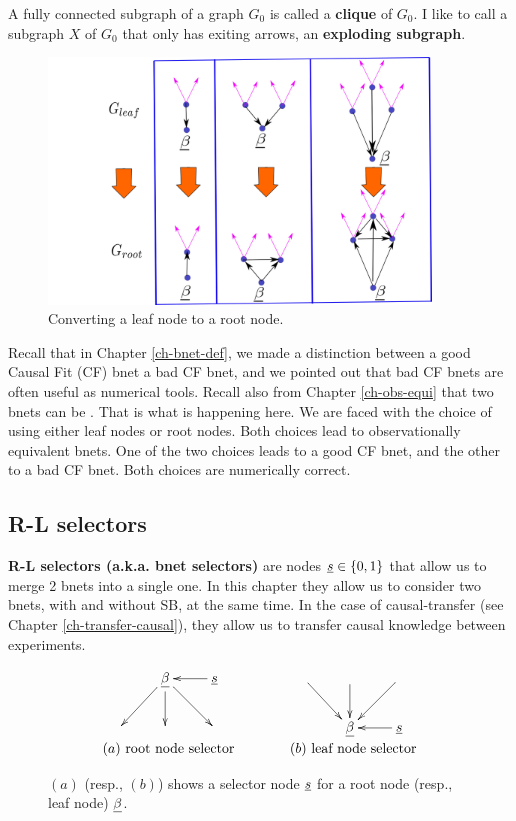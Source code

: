 A fully connected subgraph of 
a graph $G_0$ is called a 
{\bf clique} of $G_0$.
I like to call a subgraph $X$  of $G_0$ that only has exiting arrows, an 
{\bf exploding subgraph}.



\begin{figure}[h!]
\centering
\includegraphics[width=4in]
{sb-removal/sel-nd-reversal.png}
\caption{Converting 
a leaf node
to a root node.}
\label{fig-sel-nd-reversal}
\end{figure}

Recall that in Chapter \ref{ch-bnet-def},
we made a distinction
between a good Causal Fit (CF) bnet
a bad CF bnet, and
we pointed out
that bad CF bnets are
often useful as
numerical tools.
Recall also from Chapter
\ref{ch-obs-equi}
that two bnets can be
.
That is what is happening here.
We are faced with
the choice of
using
either
leaf nodes or root nodes.
Both
choices  lead to observationally
equivalent bnets.
One of the two choices
leads to a good
CF bnet,
and the other to a bad CF bnet.
Both choices are numerically
correct.

\subsection{R-L selectors}
{\bf R-L selectors (a.k.a. bnet selectors)} are  nodes 
$\rvs\in \bool$ that allow us to merge 2 bnets into a single one. In this chapter they allow us 
to consider two bnets, with and without SB, at the same time.
In the case of causal-transfer (see Chapter \ref{ch-transfer-causal}), they
allow us
 to transfer causal knowledge
between experiments.


\begin{figure}[h!]
$$
\begin{array}{ccc}
\xymatrix{
&\rvbeta\ar[dl]\ar[d]\ar[dr]&\rvs\ar[l]
\\
&&
}
&\quad\quad&
\xymatrix{
\ar[dr]&\ar[d]&\ar[dl]
\\
&\rvbeta&\rvs\ar[l]
}
\\
(a)\text{ root node selector} 
&& (b)\text{ leaf node selector}
\end{array}
$$
\caption{$(a)$ (resp., $(b)$) shows a selector node $\rvs$ for a
root node (resp., leaf node) $\rvbeta$.}
\label{fig-rl-selectors}
\end{figure}


